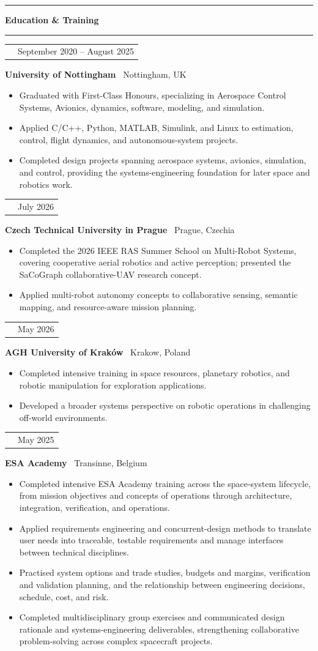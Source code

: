 \documentclass[10pt,a4paper]{article}
\makeatletter
\newcommand{\SectionSize}{11.5pt}
\newcommand{\RoleSize}{10.3pt}
\newcommand{\CompanySize}{9.6pt}
\newcommand{\DurationSize}{9pt}
\newcommand{\BodySize}{9.2pt}
\newcommand{\SectionLineSize}{12pt}
\newcommand{\RoleLineSize}{11.5pt}
\newcommand{\CompanyLineSize}{10.8pt}
\newcommand{\DurationLineSize}{9pt}
\newcommand{\BodyLineSize}{11pt}
\newcommand{\SectionBefore}{4pt}
\newcommand{\SectionLineToTitle}{0pt}
\newcommand{\SectionTitleToLine}{2pt}
\newcommand{\SectionLineToEntry}{0pt}
\newcommand{\EntryBefore}{0pt}
\newcommand{\RoleToCompany}{-5pt}
\newcommand{\CompanyToBullets}{3pt}
\newcommand{\EntryAfter}{6pt}
\newcommand{\BulletSpacing}{2pt}
\newcommand{\BulletBefore}{0pt}
\newcommand{\BulletIndent}{1.25em}
\newcommand{\SectionLineThickness}{1.5pt}
\newcommand{\SubsectionLineThickness}{0.4pt}
\newcommand{\DurationWidth}{4.5cm}
\newcommand{\CVSection}[1]{

    \vspace{\SectionBefore}


    \noindent
    \textcolor{CVBlack}{
        \rule{\textwidth}{\SectionLineThickness}
    }

    \vspace{\SectionLineToTitle}


    {\fontsize{\SectionSize}{\SectionLineSize}
    \selectfont
    \textbf{\textcolor{CVBlack}{#1}}}

    \vspace{\SectionTitleToLine}


    \noindent
    \textcolor{CVLightGray}{
        \rule{\textwidth}{\SubsectionLineThickness}
    }

    \vspace{\SectionLineToEntry}
}
\newcommand{\CVEntry}[5]{

    \vspace{\EntryBefore}


    \noindent
    \begin{tabularx}{\textwidth}{
        @{}
        >{\raggedright\arraybackslash}X
        >{\raggedleft\arraybackslash}p{\DurationWidth}
        @{}
    }

        {\fontsize{\RoleSize}{\RoleLineSize}
        \selectfont
        \textbf{\textcolor{CVBlack}{#1}}}
        &
        {\fontsize{\DurationSize}{\DurationLineSize}
        \selectfont
        \textcolor{CVGray}{#4}}

    \end{tabularx}

    \vspace{\RoleToCompany}


    \noindent
    {\fontsize{\CompanySize}{\CompanyLineSize}
    \selectfont
    \textbf{\textcolor{CVDarkGray}{#2}}
    \textcolor{CVGray}{\textbar\ #3}}

    \vspace{\CompanyToBullets}


    \begin{itemize}[
        leftmargin=\BulletIndent,
        itemsep=\BulletSpacing,
        topsep=\BulletBefore,
        parsep=0pt,
        partopsep=0pt
    ]
        #5
    \end{itemize}

    \vspace{\EntryAfter}
}
\newcommand{\CVBullet}[1]{
    \item
    {\fontsize{\BodySize}{\BodyLineSize}
    \selectfont
    \textcolor{CVDarkGray}{#1}}
}
\makeatother
\begin{document}
\CVSection{Education \& Training}

\CVEntry
{MEng Aerospace Engineering -- First-Class Honours}
{University of Nottingham}
{Nottingham, UK}
{September 2020 -- August 2025}
{
    \CVBullet{Graduated with First-Class Honours, specializing in Aerospace Control Systems, Avionics, dynamics, software, modeling, and simulation.}

    \CVBullet{Applied C/C++, Python, MATLAB, Simulink, and Linux to estimation, control, flight dynamics, and autonomous-system projects.}

    \CVBullet{Completed design projects spanning aerospace systems, avionics, simulation, and control, providing the systems-engineering foundation for later space and robotics work.}
}

\CVEntry
{IEEE RAS Summer School on Multi-Robot Systems}
{Czech Technical University in Prague}
{Prague, Czechia}
{July 2026}
{
    \CVBullet{Completed the 2026 IEEE RAS Summer School on Multi-Robot Systems, covering cooperative aerial robotics and active perception; presented the SaCoGraph collaborative-UAV research concept.}

    \CVBullet{Applied multi-robot autonomy concepts to collaborative sensing, semantic mapping, and resource-aware mission planning.}
}

\CVEntry
{Space Resources \& Robotics Summer School}
{AGH University of Kraków}
{Krakow, Poland}
{May 2026}
{
    \CVBullet{Completed intensive training in space resources, planetary robotics, and robotic manipulation for exploration applications.}

    \CVBullet{Developed a broader systems perspective on robotic operations in challenging off-world environments.}
}

\CVEntry
{Space Systems Engineering Training Course}
{ESA Academy}
{Transinne, Belgium}
{May 2025}
{
    \CVBullet{Completed intensive ESA Academy training across the space-system lifecycle, from mission objectives and concepts of operations through architecture, integration, verification, and operations.}

    \CVBullet{Applied requirements engineering and concurrent-design methods to translate user needs into traceable, testable requirements and manage interfaces between technical disciplines.}

    \CVBullet{Practised system options and trade studies, budgets and margins, verification and validation planning, and the relationship between engineering decisions, schedule, cost, and risk.}

    \CVBullet{Completed multidisciplinary group exercises and communicated design rationale and systems-engineering deliverables, strengthening collaborative problem-solving across complex spacecraft projects.}
}
\end{document}
